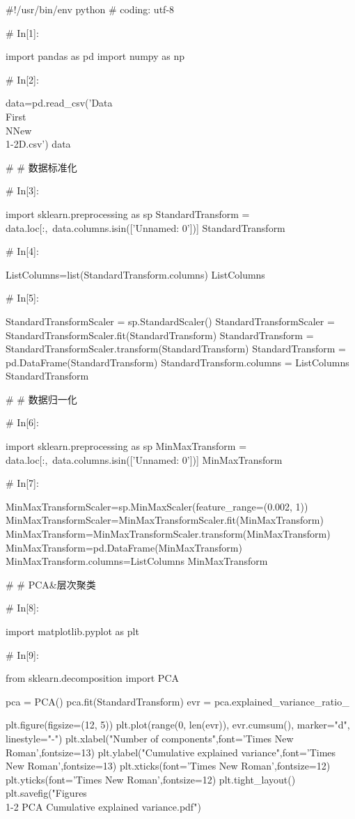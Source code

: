 \documentclass{MathorCupModeling}
\begin{document}
\begin{python}
#!/usr/bin/env python
# coding: utf-8

# In[1]:


import pandas as pd
import numpy as np


# In[2]:


data=pd.read_csv('Data\\First\\NNew\\1-2D.csv')
data


# # 数据标准化

# In[3]:


import sklearn.preprocessing as sp
StandardTransform = data.loc[:,~data.columns.isin(['Unnamed: 0'])]
StandardTransform


# In[4]:


ListColumns=list(StandardTransform.columns)
ListColumns


# In[5]:


StandardTransformScaler = sp.StandardScaler()
StandardTransformScaler = StandardTransformScaler.fit(StandardTransform)
StandardTransform = StandardTransformScaler.transform(StandardTransform)
StandardTransform = pd.DataFrame(StandardTransform)
StandardTransform.columns = ListColumns
StandardTransform


# # 数据归一化

# In[6]:


import sklearn.preprocessing as sp
MinMaxTransform = data.loc[:,~data.columns.isin(['Unnamed: 0'])]
MinMaxTransform


# In[7]:


MinMaxTransformScaler=sp.MinMaxScaler(feature_range=(0.002, 1))
MinMaxTransformScaler=MinMaxTransformScaler.fit(MinMaxTransform)
MinMaxTransform=MinMaxTransformScaler.transform(MinMaxTransform)
MinMaxTransform=pd.DataFrame(MinMaxTransform)
MinMaxTransform.columns=ListColumns
MinMaxTransform


# # PCA&层次聚类

# In[8]:


import matplotlib.pyplot as plt


# In[9]:


from sklearn.decomposition import PCA

pca = PCA()
pca.fit(StandardTransform)
evr = pca.explained_variance_ratio_

plt.figure(figsize=(12, 5))
plt.plot(range(0, len(evr)), evr.cumsum(), marker="d", linestyle="-")
plt.xlabel("Number of components",font='Times New Roman',fontsize=13)
plt.ylabel("Cumulative explained variance",font='Times New Roman',fontsize=13)
plt.xticks(font='Times New Roman',fontsize=12)
plt.yticks(font='Times New Roman',fontsize=12)
plt.tight_layout()
plt.savefig("Figures\\1-2 PCA Cumulative explained variance.pdf")



\end{python}
\end{document}
